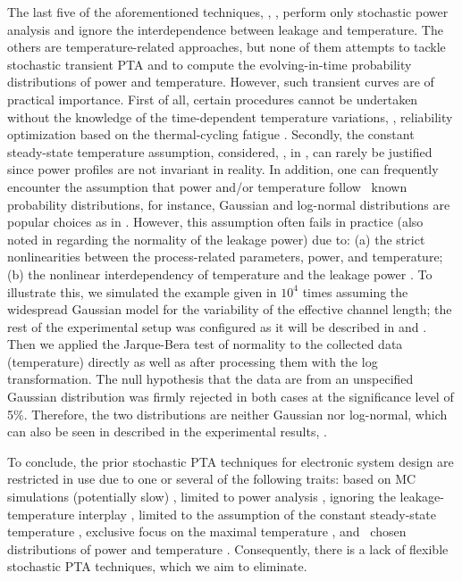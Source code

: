 The last five of the aforementioned techniques, \ie, \cite{shen2009, bhardwaj2006, bhardwaj2008, vrudhula2006, ghanta2006}, perform only stochastic power analysis and ignore the interdependence between leakage and temperature.
The others are temperature-related approaches, but none of them attempts to tackle stochastic transient PTA and to compute the evolving-in-time probability distributions of power and temperature.
However, such transient curves are of practical importance.
First of all, certain procedures cannot be undertaken without the knowledge of the time-dependent temperature variations, \eg, reliability optimization based on the thermal-cycling fatigue \cite{ukhov2012}.
Secondly, the constant steady-state temperature assumption, considered, \eg, in \cite{juan2011, juan2012, huang2009, lee2013}, can rarely be justified since power profiles are not invariant in reality.
In addition, one can frequently encounter the assumption that power and/or temperature follow \apriori\ known probability distributions, for instance, Gaussian and log-normal distributions are popular choices as in \cite{srivastava2010, juan2012, bhardwaj2006}.
However, this assumption often fails in practice (also noted in \cite{juan2012} regarding the normality of the leakage power) due to: (a) the strict nonlinearities between the process-related parameters, power, and temperature; (b) the nonlinear interdependency of temperature and the leakage power \cite{liu2007}.
To illustrate this, we simulated the example given in  $10^4$ times assuming the widespread Gaussian model for the variability of the effective channel length; the rest of the experimental setup was configured as it will be described in  and .
Then we applied the Jarque-Bera test of normality to the collected data (temperature) directly as well as after processing them with the log transformation.
The null hypothesis that the data are from an unspecified Gaussian distribution was firmly rejected in both cases at the significance level of 5\%.
Therefore, the two distributions are neither Gaussian nor log-normal, which can also be seen in  described in the experimental results, .

To conclude, the prior stochastic PTA techniques for electronic system design are restricted in use due to one or several of the following traits: based on MC simulations (potentially slow) \cite{chandra2010}, limited to power analysis \cite{chandra2010, shen2009, bhardwaj2006, bhardwaj2008, vrudhula2006, ghanta2006}, ignoring the leakage-temperature interplay \cite{huang2009, shen2009, bhardwaj2006, bhardwaj2008, vrudhula2006, ghanta2006}, limited to the assumption of the constant steady-state temperature \cite{juan2011, juan2012, huang2009, lee2013}, exclusive focus on the maximal temperature \cite{juan2011}, and \apriori\ chosen distributions of power and temperature \cite{srivastava2010, juan2012, bhardwaj2006}.
Consequently, there is a lack of flexible stochastic PTA techniques, which we aim to eliminate.
